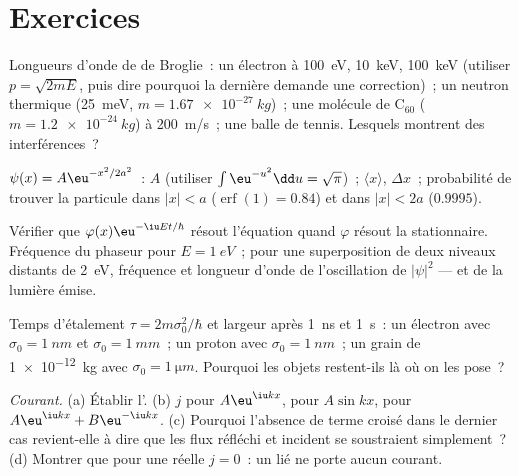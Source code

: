 \section{Exercices}

\begin{exercise}[$\star$]\label{exo:b2:schrodinger-wave-functions:1}
Longueurs d'onde de de Broglie~: un électron à \qty{100}{eV}, \qty{10}{keV},
\qty{100}{keV} (utiliser $p = \sqrt{2mE}$, puis dire pourquoi la dernière demande une
correction)~; un neutron thermique (\qty{25}{meV}, $m = \qty{1.67e-27}{kg}$)~; une
molécule de C$_{60}$ ($m = \qty{1.2e-24}{kg}$) à \qty{200}{m/s}~; une balle de
tennis. Lesquels montrent des interférences~?
\end{exercise}

\begin{exercise}[$\star$]\label{exo:b2:schrodinger-wave-functions:2}
$\psi(x) = A\eu^{-x^2/2a^2}$~: $A$ (utiliser $\int\eu^{-u^2}\dd u = \sqrt\pi$)~;
$\langle x\rangle$, $\Delta x$~; probabilité de trouver la particule dans
$|x| < a$ ($\operatorname{erf}(1) = 0.84$) et dans $|x| < 2a$ ($0.9995$).
\end{exercise}

\begin{exercise}[$\star$]\label{exo:b2:schrodinger-wave-functions:3}
Vérifier que $\varphi(x)\eu^{-\iu Et/\hbar}$ résout l'équation quand $\varphi$
résout la stationnaire. Fréquence du phaseur pour $E = \qty{1}{eV}$~;
pour une superposition de deux niveaux distants de \qty{2}{eV}, fréquence et
longueur d'onde de l'oscillation de $|\psi|^2$ --- et de la lumière
émise.
\end{exercise}

\begin{exercise}[$\star$]\label{exo:b2:schrodinger-wave-functions:4}
Temps d'étalement $\tau = 2m\sigma_0^2/\hbar$ et largeur après \qty{1}{ns} et
\qty{1}{s}~: un électron avec $\sigma_0 = \qty{1}{nm}$ et $\sigma_0 = \qty{1}{mm}$~;
un proton avec $\sigma_0 = \qty{1}{nm}$~; un grain de \qty{1e-12}{kg} avec
$\sigma_0 = \qty{1}{\micro m}$. Pourquoi les objets restent-ils là où on les pose~?
\end{exercise}

\begin{exercise}[$\star\star$]\label{exo:b2:schrodinger-wave-functions:5}
\emph{Courant.} (a) Établir l'. (b) $j$ pour
$A\eu^{\iu kx}$, pour $A\sin kx$, pour $A\eu^{\iu kx} + B\eu^{-\iu kx}$. (c) Pourquoi
l'absence de terme croisé dans le dernier cas revient-elle à dire que
les flux réfléchi et incident se soustraient simplement~? (d) Montrer que pour une  réelle $j = 0$~: un  lié ne porte aucun courant.
\end{exercise}


